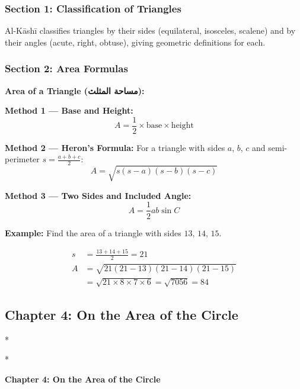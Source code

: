 \documentclass[11pt,a4paper]{article}
\newcommand{\ar}[1]{{\arabicfont\beginR #1\endR}}
\newenvironment{bilingual}{%
  \vspace{0.3em}%
  \begin{paracol}{2}%
}{%
  \end{paracol}%
  \vspace{0.3em}%
}
\newenvironment{mathalgo}{%
  \par\vspace{0.3cm}
  \begin{framed}
  \setlength{\parindent}{0pt}
}{%
  \end{framed}
  \par\vspace{0.3cm}
}
\begin{document}
\subsubsection{Section 1: Classification of Triangles}

Al-K\=ash\=i classifies triangles by their sides (equilateral, isosceles,
scalene) and by their angles (acute, right, obtuse), giving geometric
definitions for each.

\subsubsection{Section 2: Area Formulas}

\begin{mathalgo}
\textbf{Area of a Triangle (\ar{مساحة المثلث}):}

\textbf{Method 1 --- Base and Height:}
\[
A = \frac{1}{2} \times \text{base} \times \text{height}
\]

\textbf{Method 2 --- Heron's Formula:}
For a triangle with sides $a$, $b$, $c$ and semi-perimeter $s =
\frac{a+b+c}{2}$:
\[
A = \sqrt{s(s-a)(s-b)(s-c)}
\]

\textbf{Method 3 --- Two Sides and Included Angle:}
\[
A = \frac{1}{2} ab \sin C
\]
\end{mathalgo}

\noindent\textbf{Example:} Find the area of a triangle with sides $13$,
$14$, $15$.

\begin{align*}
s &= \frac{13 + 14 + 15}{2} = 21 \\
A &= \sqrt{21(21-13)(21-14)(21-15)} \\
&= \sqrt{21 \times 8 \times 7 \times 6} = \sqrt{7056} = 84
\end{align*}

\subsection{Chapter 4: On the Area of the Circle}

\begin{bilingual}
\switchcolumn[0]*
\begin{center}
\textbf{\color{chapcolor}\ar{فصل في مساحة الدائرة ومعرفة محيطها من قطرها وعكس ذلك}}
\end{center}
\switchcolumn[1]*
\begin{center}
\textbf{\color{chapcolor}Chapter 4: On the Area of the Circle}
\end{center}
\end{bilingual}
\end{document}
